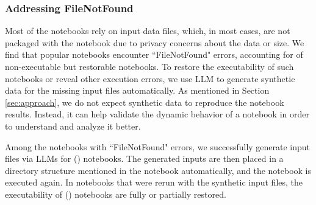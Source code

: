     \subsubsection{Addressing FileNotFound} 

        Most of the notebooks rely on input data files, which, in most cases, are not packaged with the notebook due to privacy concerns about the data or size. We find that \totalFileNotFound popular notebooks encounter ``FileNotFound" errors, accounting for \percentFileNotFoundInRestorable of non-executable but restorable notebooks. To restore the executability of such notebooks or reveal other execution errors, we use LLM to generate synthetic data for the missing input files automatically.
        As mentioned in Section \ref{sec:approach}, we do not expect synthetic data to reproduce the notebook results. Instead, it can help validate the dynamic behavior of a notebook in order to understand and analyze it better. 
        
        Among the notebooks with ``FileNotFound" errors, we successfully generate input files via LLMs for \totalSuccessfulToGenerateFiles (\percentSuccessfulToGenerateFiles) notebooks. The generated inputs are then placed in a directory structure mentioned in the notebook automatically, and the notebook is executed again. In \totalSuccessfulToGenerateFiles notebooks that were rerun with the synthetic input files, the executability of \totalFileNotFoundRestored (\percentFileNotFoundRestoredInSuccessfullyGenerated) notebooks are fully or partially restored.
        
